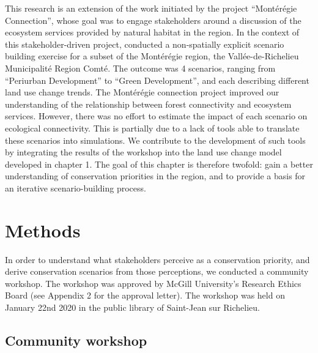 This research is an extension of the work initiated by the project “Montérégie Connection”, whose goal was to engage stakeholders around a discussion of the ecosystem services provided by natural habitat in the region. In the context of this stakeholder-driven project, \cite{mitchell_monteregie_2015} conducted a non-spatially explicit scenario building exercise for a subset of the Montérégie region, the Vallée-de-Richelieu Municipalité Region Comté. The outcome was 4 scenarios, ranging from “Periurban Development” to “Green Development”, and each describing different land use change trends. The Montérégie connection project improved our understanding of the relationship between forest connectivity and ecosystem services. However, there was no effort to estimate the impact of each scenario on ecological connectivity. This is partially due to a lack of tools able to translate these scenarios into simulations. We contribute to the development of such tools by integrating the results of the workshop into the land use change model developed in chapter 1. The goal of this chapter is therefore twofold: gain a better understanding of conservation priorities in the region, and to provide a basis for an iterative scenario-building process. \\

\section{Methods}

In order to understand what stakeholders perceive as a conservation priority, and derive conservation scenarios from those perceptions, we conducted a community workshop. The workshop was approved by McGill University’s Research Ethics Board (see Appendix 2 for the approval letter). The workshop was held on January 22nd 2020 in the public library of Saint-Jean sur Richelieu. \\

\subsection{Community workshop}

